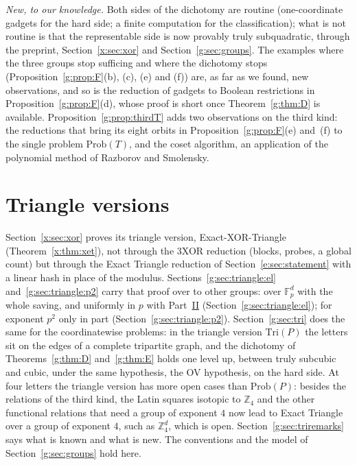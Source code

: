 \documentclass[11pt]{article}
\theoremstyle{definition}
\theoremstyle{remark}
\newcommand{\Z}{\mathbb{Z}}
\newcommand{\Fp}{\mathbb{F}_p}
\newcommand{\Prob}{\mathrm{Prob}}
\begin{document}
\emph{New, to our knowledge.} Both sides of the dichotomy are routine (one-coordinate gadgets for the hard side; a finite computation for the classification); what is not routine is that the representable side is now provably truly subquadratic, through the preprint, Section~\ref{x:sec:xor} and Section~\ref{g:sec:groups}. The examples where the three groups stop sufficing and where the dichotomy stops (Proposition~\ref{g:prop:F}(b), (c), (e) and (f)) are, as far as we found, new observations, and so is the reduction of gadgets to Boolean restrictions in Proposition~\ref{g:prop:F}(d), whose proof is short once Theorem~\ref{g:thm:D} is available. Proposition~\ref{g:prop:thirdT} adds two observations on the third kind: the reductions that bring its eight orbits in Proposition~\ref{g:prop:F}(e) and~(f) to the single problem $\Prob(T)$, and the coset algorithm, an application of the polynomial method of Razborov and Smolensky.

\section{Triangle versions}\label{g:sec:triangle}

Section~\ref{x:sec:xor} proves its triangle version, Exact-XOR-Triangle (Theorem~\ref{x:thm:xet}), not through the 3XOR reduction (blocks, probes, a global count) but through the Exact Triangle reduction of Section~\ref{e:sec:statement} with a linear hash in place of the modulus. Sections~\ref{g:sec:triangle:el} and~\ref{g:sec:triangle:p2} carry that proof over to other groups: over $\Fp^d$ with the whole saving, and uniformly in $p$ with Part~\hyperref[m:partII]{II} (Section~\ref{g:sec:triangle:el}); for exponent $p^2$ only in part (Section~\ref{g:sec:triangle:p2}). Section~\ref{g:sec:tri} does the same for the coordinatewise problems: in the triangle version $\mathrm{Tri}(P)$ the letters sit on the edges of a complete tripartite graph, and the dichotomy of Theorems~\ref{g:thm:D} and~\ref{g:thm:E} holds one level up, between truly subcubic and cubic, under the same hypothesis, the OV hypothesis, on the hard side. At four letters the triangle version has more open cases than $\Prob(P)$: besides the relations of the third kind, the Latin squares isotopic to $\Z_4$ and the other functional relations that need a group of exponent $4$ now lead to Exact Triangle over a group of exponent $4$, such as $\Z_4^d$, which is open. Section~\ref{g:sec:triremarks} says what is known and what is new. The conventions and the model of Section~\ref{g:sec:groups} hold here.
\end{document}
